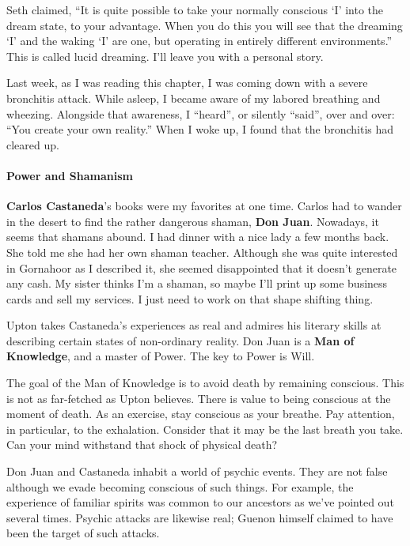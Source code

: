 Seth claimed, “It is quite possible to take your normally conscious `I' into the dream state, to your advantage. When you do this you will see that the dreaming `I' and the waking `I' are one, but operating in entirely different environments.” This is called lucid dreaming. I'll leave you with a personal story.

\begin{quotex}
Last week, as I was reading this chapter, I was coming down with a severe bronchitis attack. While asleep, I became aware of my labored breathing and wheezing. Alongside that awareness, I “heard”, or silently “said”, over and over: “You create your own reality.” When I woke up, I found that the bronchitis had cleared up. 

\end{quotex}
\paragraph{Power and Shamanism}
\textbf{Carlos Castaneda}'s books were my favorites at one time. Carlos had to wander in the desert to find the rather dangerous shaman, \textbf{Don Juan}. Nowadays, it seems that shamans abound. I had dinner with a nice lady a few months back. She told me she had her own shaman teacher. Although she was quite interested in Gornahoor as I described it, she seemed disappointed that it doesn't generate any cash. My sister thinks I'm a shaman, so maybe I'll print up some business cards and sell my services. I just need to work on that shape shifting thing.

Upton takes Castaneda's experiences as real and admires his literary skills at describing certain states of non-ordinary reality. Don Juan is a \textbf{Man of Knowledge}, and a master of Power. The key to Power is Will.

The goal of the Man of Knowledge is to avoid death by remaining conscious. This is not as far-fetched as Upton believes. There is value to being conscious at the moment of death. As an exercise, stay conscious as your breathe. Pay attention, in particular, to the exhalation. Consider that it may be the last breath you take. Can your mind withstand that shock of physical death?

Don Juan and Castaneda inhabit a world of psychic events. They are not false although we evade becoming conscious of such things. For example, the experience of familiar spirits was common to our ancestors as we've pointed out several times. Psychic attacks are likewise real; Guenon himself claimed to have been the target of such attacks.

